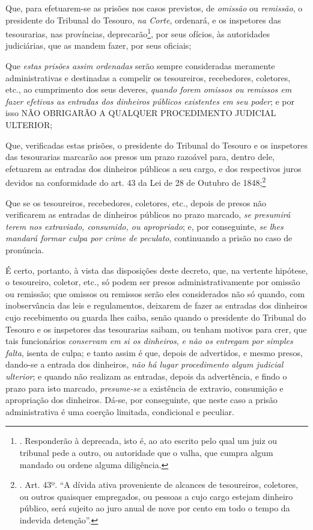 Que, para efetuarem-se as prisões nos casos previstos, de \emph{omissão}
ou \emph{remissão}, o presidente do Tribunal do Tesouro, \emph{na
Corte}, ordenará, e os inspetores das tesourarias, nas províncias,
deprecarão\footnote{. Responderão à deprecada, isto é, ao ato escrito
  pelo qual um juiz ou tribunal pede a outro, ou autoridade que o valha,
  que cumpra algum mandado ou ordene alguma diligência.}, por seus
ofícios, às autoridades judiciárias, que as mandem fazer, por seus
oficiais;

Que \emph{estas prisões assim ordenadas} serão sempre consideradas
meramente administrativas e destinadas a compelir os tesoureiros,
recebedores, coletores, etc., ao cumprimento dos seus deveres,
\emph{quando forem omissos ou remissos em fazer efetivas as entradas dos
dinheiros públicos existentes em seu poder}; e por isso NÃO OBRIGARÃO A
QUALQUER PROCEDIMENTO JUDICIAL ULTERIOR;

Que, verificadas estas prisões, o presidente do Tribunal do Tesouro e os
inspetores das tesourarias marcarão aos presos um prazo razoável para,
dentro dele, efetuarem as entradas dos dinheiros públicos a seu cargo, e
dos respectivos juros devidos na conformidade do art. 43 da Lei de 28 de
Outubro de 1848;\footnote{. Art. 43º. ``A dívida ativa proveniente de
  alcances de tesoureiros, coletores, ou outros quaisquer empregados, ou
  pessoas a cujo cargo estejam dinheiro público, será sujeito ao juro
  anual de nove por cento em todo o tempo da indevida detenção''.}

Que se os tesoureiros, recebedores, coletores, etc., depois de presos
não verificarem as entradas de dinheiros públicos no prazo marcado,
\emph{se presumirá terem nos extraviado, consumido, ou apropriado}; e,
por conseguinte, \emph{se lhes mandará formar culpa por crime de
peculato}, continuando a prisão no caso de pronúncia.

É certo, portanto, à vista das disposições deste decreto, que, na
vertente hipótese, o tesoureiro, coletor, etc., só podem ser presos
administrativamente por omissão ou remissão; que omissos ou remissos
serão eles considerados não só quando, com inobservância das leis e
regulamentos, deixarem de fazer as entradas dos dinheiros cujo
recebimento ou guarda lhes caiba, senão quando o presidente do Tribunal
do Tesouro e os inspetores das tesourarias saibam, ou tenham motivos
para crer, que tais funcionários \emph{conservam em si os dinheiros},
\emph{e não os entregam por simples falta}, isenta de culpa; e tanto
assim é que, depois de advertidos, e mesmo presos, dando-se a entrada
dos dinheiros, \emph{não há lugar procedimento algum judicial ulterior};
e quando não realizam as entradas, depois da advertência, e findo o
prazo para isto marcado, \emph{presume-se} a existência de extravio,
consumição e apropriação dos dinheiros. Dá-se, por conseguinte, que
neste caso a prisão administrativa é uma coerção limitada, condicional e
peculiar.

